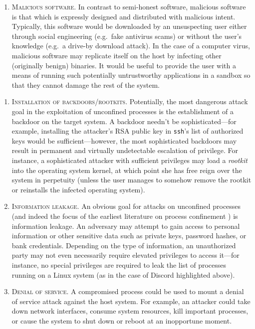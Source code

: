 \documentclass[dvipsnames, 12pt]{article}
\begin{document}
\begin{enumerate}[label=\bfseries A\arabic*., ref=A\arabic*, labelindent=1em]
    \item \label{a:3} \textsc{Malicious software.} In contrast to semi-honest
    software, malicious software is that which is expressly designed and
    distributed with malicious intent. Typically, this software would be
    downloaded by an unsuspecting user either through social engineering
    (e.g.~fake antivirus scams) or without the user's knowledge (e.g.~a drive-by
    download attack). In the case of a computer virus, malicious software may
    replicate itself on the host by infecting other (originally benign) binaries.
    It would be useful to provide the user with a means of running such
    potentially untrustworthy applications in a sandbox so that they cannot
    damage the rest of the system.
\end{enumerate}

\begin{enumerate}[label=\bfseries G\arabic*., ref=G\arabic*, labelindent=1em]
    \item \label{g:1} \textsc{Installation of backdoors/rootkits.} Potentially,
    the most dangerous attack goal in the exploitation of unconfined processes
    is the establishment of a backdoor on the target system.  A backdoor needn't
    be sophisticated---for example, installing the attacker's RSA public key in
    \texttt{ssh}'s list of authorized keys would be sufficient---however, the
    most sophisticated backdoors may result in permanent and virtually
    undetectable escalation of privilege. For instance, a sophisticated attacker
    with sufficient privileges may load a \textit{rootkit}
    \cite{beegle2007_rootkit} into the operating system kernel, at which point
    she has free reign over the system in perpetuity (unless the user manages
    to somehow remove the rootkit or reinstalls the infected operating system).

    \item \label{g:2} \textsc{Information leakage.} An obvious goal for attacks
    on unconfined processes (and indeed the focus of the earliest literature on
    process confinement \cite{lampson1973_a_note}) is information leakage. An
    adversary may attempt to gain access to personal information or other
    sensitive data such as private keys, password hashes, or bank credentials.
    Depending on the type of information, an unauthorized party may not even
    necessarily require elevated privileges to access it---for instance, no
    special privileges are required to leak the list of processes running on
    a Linux system (as in the case of Discord \cite{discord} highlighted above).

    \item \label{g:3} \textsc{Denial of service.} A compromised process could be
    used to mount a denial of service attack against the host system. For
    example, an attacker could take down network interfaces, consume system
    resources, kill important processes, or cause the system to shut down or
    reboot at an inopportune moment.
\end{enumerate}
\end{document}
